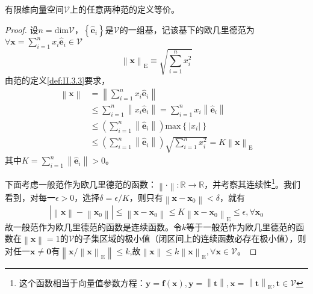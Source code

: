 \documentclass[main.tex]{subfiles}
\begin{document}
\begin{theorem}\label{thm:II.13.1}
有限维向量空间$\mathcal{V}$上的任意两种范的定义等价。
\end{theorem}
\begin{proof}
设$n=\mathrm{dim}\mathcal{V}$，$\left\{\mathbf{\hat{e}}_i\right\}$是$\mathcal{V}$的一组基，记该基下的欧几里德范为$\forall\mathbf{x}=\sum_{i=1}^nx_i\mathbf{\hat{e}}_i\in\mathcal{V}$
\[\left\|\mathbf{x}\right\|_\mathrm{E}\equiv\sqrt{\sum_{i=1}^n x_i^2}\]
由范的定义\ref{def:II.3.3}要求，
\begin{align*}
\left\|\mathbf{x}\right\|&=\left\|\sum_{i=1}^nx_i\mathbf{\hat{e}}_i\right\|\\
&\leq \sum_{i=1}^n\left\|x_i\mathbf{\hat{e}}_i\right\|=\sum_{i=1}^nx_i\left\|\mathbf{\hat{e}}_i\right\|\\
&\leq \left(\sum_{i=1}^n\left\|\mathbf{\hat{e}}_i\right\|\right)\mathrm{max}\left\{\left|x_i\right|\right\}\\
&\leq \left(\sum_{i=1}^n\left\|\mathbf{\hat{e}}_i\right\|\right)\sqrt{\sum_{i=1}^nx_i^2}= K\left\|\mathbf{x}\right\|_\mathrm{E}
\end{align*}
其中$K=\sum_{i=1}^n\left\|\mathbf{\hat{e}}_i\right\|>0$。

下面考虑一般范作为欧几里德范的函数：$\left\|\cdot\right\|:\mathbb{R}\rightarrow\mathbb{R}$，并考察其连续性\footnote{这个函数相当于向量值参数方程：$\mathbf{y}=\mathbf{f}\left(\mathbf{x}\right),\mathbf{y}=\left\|\mathbf{t}\right\|,\mathbf{x}=\left\|\mathbf{t}\right\|_\mathrm{E},\mathbf{t}\in\mathcal{V}$}。我们看到，对每一$\epsilon>0$，选择$\delta=\epsilon/K$，则只有$\left\|\mathbf{x}-\mathbf{x}_0\right\|<\delta$，就有
\[
\left|\left\|\mathbf{x}\right\|-\left\|\mathbf{x}_0\right\|\right|\leq\left\|\mathbf{x}-\mathbf{x}_0\right\|\leq K\left\|\mathbf{x}-\mathbf{x}_0\right\|_\mathrm{E}\leq\epsilon,\forall\mathbf{x}_0\]
故一般范作为欧几里德范的函数是连续函数。令$k$等于一般范作为欧几里德范的函数在$\left\|\mathbf{x}\right\|=1$的$\mathcal{V}$的子集区域的极小值（闭区间上的连续函数必存在极小值），则对任一$\mathbf{x}\neq\mathbf{0}$有$\left\|\mathbf{x}/\left\|\mathbf{x}\right\|_\mathrm{E}\right\|\leq k$,故$\left\|\mathbf{x}\right\|\leq k\left\|\mathbf{x}\right\|_\mathrm{E},\forall \mathbf{x}\in\mathcal{V}$。
\end{proof}
\end{document}
